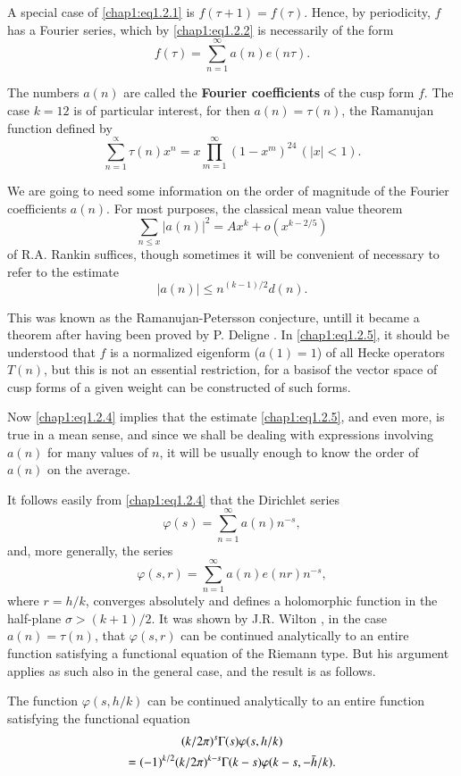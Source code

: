 A special case of \eqref{chap1:eq1.2.1} is $f(\tau+1)=f(\tau)$. Hence,
by periodicity, $f$ has a Fourier series, which by
\eqref{chap1:eq1.2.2} is necessarily of the form
\begin{equation}\label{chap1:eq1.2.3}
f(\tau)=\sum\limits_{n=1}^\infty a(n)e(n\tau).
\end{equation}

The numbers $a(n)$ are called the {\bf Fourier coefficients} of the
cusp form $f$. The case $k =12$ is of particular interest, for
then $a(n)=\tau(n)$, the Ramanujan function defined by
$$
\sum\limits_{n=1}^\propto \tau(n)x^n=x\prod\limits_{m=1}^\infty
(1-x^m)^{24}\,(|x|<1).
$$

We are going to need some information on the order of magnitude of the
Fourier coefficients $a(n)$. For most purposes, the classical mean
value theorem
\begin{equation}\label{chap1:eq1.2.4}
\sum\limits_{n\leq x}|a(n)|^2=Ax^k + o(x^{k-2/5})
\end{equation}
of R.A. Rankin \cite{key24} suffices, though sometimes it
will be convenient of necessary to refer to the estimate
\begin{equation}\label{chap1:eq1.2.5}
|a(n)|\leq n^{(k-1)/2}d(n).
\end{equation}

This was known as the Ramanujan-Petersson conjecture, untill it became
a theorem after having been proved by P. Deligne \cite{key5}. In
\eqref{chap1:eq1.2.5}, it should be understood that $f$ is a normalized
eigenform (\ie $a(1)=1$) of all Hecke operators $T(n)$, but this is
not an essential restriction, for a basis\pageoriginale of the vector
space of cusp forms of a given weight can be constructed of such
forms.

Now \eqref{chap1:eq1.2.4} implies that the estimate
\eqref{chap1:eq1.2.5}, and even more, is true in a mean sense, and
since we shall be dealing with expressions involving $a(n)$ for many
values of $n$, it will be usually enough to know the order of $a(n)$
on the average.

It follows easily from \eqref{chap1:eq1.2.4} that the Dirichlet series 
$$
\varphi(s)=\sum\limits_{n=1}^\infty a(n)n^{-s},
$$
and, more generally, the series
$$
\varphi(s,r)=\sum\limits_{n=1}^\infty a(n)e(nr)n^{-s},
$$
where $r=h/k$, converges absolutely and defines a holomorphic function
in the half-plane $\sigma >(k+1)/2$. It was shown by J.R. Wilton
\cite{key30}, in the case $a(n)=\tau(n)$, that $\varphi(s,r)$ can be
continued analytically to an entire function satisfying a functional
equation of the Riemann type. But his argument applies as such also in
the general case, and the result is as follows.
\begin{lem}\label{chap1:lem1.2}
The function $\varphi(s,h/k)$ can be continued analytically to an
entire function satisfying the functional equation
\begin{gather}
(k/2\pi)^s\Gamma(s)\varphi(s,h/k)\label{chap1:eq1.2.6}\\
=(-1)^{k/2}(k/2\pi)^{k-s}\Gamma(k-s)\varphi (k-s,
-\bar{h}/k).\notag 
\end{gather}
\end{lem}

